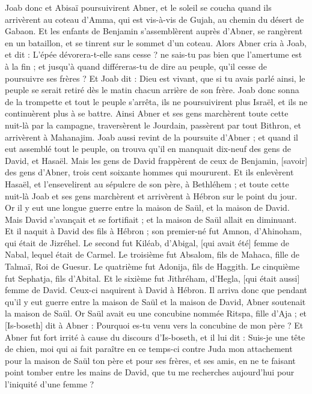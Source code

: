 \begin{multicols}{2}
Joab donc et Abisaï poursuivirent Abner, et le soleil se coucha quand ils arrivèrent au coteau d'Amma, qui est vis-à-vis de Gujah, au chemin du désert de Gabaon.
Et les enfants de Benjamin s'assemblèrent auprès d'Abner, se rangèrent en un bataillon, et se tinrent sur le sommet d'un coteau.
Alors Abner cria à Joab, et dit : L'épée dévorera-t-elle sans cesse ? ne sais-tu pas bien que l'amertume est à la fin ; et jusqu'à quand différeras-tu de dire au peuple, qu'il cesse de poursuivre ses frères ?
Et Joab dit : Dieu est vivant, que si tu avais parlé ainsi, le peuple se serait retiré dès le matin chacun arrière de son frère.
Joab donc sonna de la trompette et tout le peuple s'arrêta, ils ne poursuivirent plus Israël, et ils ne continuèrent plus à se battre.
Ainsi Abner et ses gens marchèrent toute cette nuit-là par la campagne, traversèrent le Jourdain, passèrent par tout Bithron, et arrivèrent à Mahanajim.
Joab aussi revint de la poursuite d'Abner ; et quand il eut assemblé tout le peuple, on trouva qu'il en manquait dix-neuf des gens de David, et Hasaël.
Mais les gens de David frappèrent de ceux de Benjamin, [savoir] des gens d'Abner, trois cent soixante hommes qui moururent.
Et ils enlevèrent Hasaël, et l'ensevelirent au sépulcre de son père, à Bethléhem ; et toute cette nuit-là Joab et ses gens marchèrent et arrivèrent à Hébron sur le point du jour.
\VerseOne{}Or il y eut une longue guerre entre la maison de Saül, et la maison de David. Mais David s'avançait et se fortifiait ; et la maison de Saül allait en diminuant.
Et il naquit à David des fils à Hébron ; son premier-né fut Amnon, d'Ahinoham, qui était de Jizréhel.
Le second fut Kiléab, d'Abigal, [qui avait été] femme de Nabal, lequel était de Carmel. Le troisième fut Absalom, fils de Mahaca, fille de Talmaï, Roi de Guesur.
Le quatrième fut Adonija, fils de Haggith. Le cinquième fut Sephatja, fils d'Abital.
Et le sixième fut Jithréham, d'Hegla, [qui était aussi] femme de David. Ceux-ci naquirent à David à Hébron.
Il arriva donc que pendant qu'il y eut guerre entre la maison de Saül et la maison de David, Abner soutenait la maison de Saül.
Or Saül avait eu une concubine nommée Ritspa, fille d'Aja ; et [Is-boseth] dit à Abner : Pourquoi es-tu venu vers la concubine de mon père ?
Et Abner fut fort irrité à cause du discours d'Is-boseth, et il lui dit : Suis-je une tête de chien, moi qui ai fait paraître en ce temps-ci contre Juda mon attachement pour la maison de Saül ton père et pour ses frères, et ses amis, en ne te faisant point tomber entre les mains de David, que tu me recherches aujourd'hui pour l'iniquité d'une femme ?

\end{multicols}

